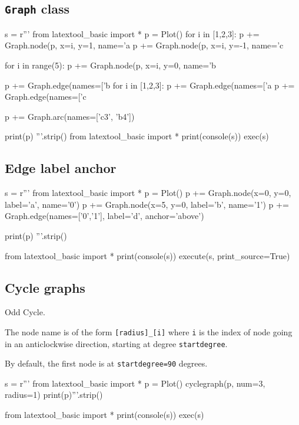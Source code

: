 \subsection{\texttt{Graph} class}


\begin{python}
s = r'''
from latextool_basic import *
p = Plot()
for i in [1,2,3]:
    p += Graph.node(p, x=i, y=1, name='a%
    p += Graph.node(p, x=i, y=-1, name='c%

for i in range(5):
    p += Graph.node(p, x=i, y=0, name='b%

p += Graph.edge(names=['b%
for i in [1,2,3]:
    p += Graph.edge(names=['a%
    p += Graph.edge(names=['c%

p += Graph.arc(names=['c3', 'b4'])

print(p)
'''.strip()
from latextool_basic import *
print(console(s))
exec(s)
\end{python}




\newpage
\subsection{Edge label anchor}
\begin{python}
s = r'''
from latextool_basic import *
p = Plot()
p += Graph.node(x=0, y=0, label='a', name='0')
p += Graph.node(x=5, y=0, label='b', name='1')
p += Graph.edge(names=['0','1'], label='d', anchor='above')

print(p)
'''.strip()

from latextool_basic import *
print(console(s))
execute(s, print_source=True)
\end{python}




\newpage
\subsection{Cycle graphs}

Odd Cycle.

The node name is of the form \verb![radius]_[i]!
where \verb!i! is the index of node going in an anticlockwise
direction, starting at degree \verb!startdegree!.

By default, the first node is at \verb!startdegree=90! degrees.

\begin{python}
s = r'''
from latextool_basic import *
p = Plot()
cyclegraph(p, num=3, radius=1)
print(p)'''.strip()

from latextool_basic import *
print(console(s))
exec(s)
\end{python}


